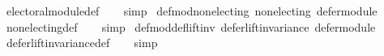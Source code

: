 \begin{isabellebody}
\ electoral{\isacharunderscore}{\kern0pt}module{\isacharunderscore}{\kern0pt}def\isanewline
\ \ \isamarkupfalse%
\ simp%
\endisatagproof
{\isafoldproof}%
%
\isadelimproof
%
\endisadelimproof
%
\isadelimdocument
%
\endisadelimdocument
%
\isatagdocument
%
\isamarkuptrue%
%
\endisatagdocument
{\isafolddocument}%
%
\isadelimdocument
%
\endisadelimdocument
{}\isamarkupfalse%
\ def{\isacharunderscore}{\kern0pt}mod{\isacharunderscore}{\kern0pt}non{\isacharunderscore}{\kern0pt}electing{\isacharcolon}{\kern0pt}\ {\isachardoublequoteopen}non{\isacharunderscore}{\kern0pt}electing\ defer{\isacharunderscore}{\kern0pt}module{\isachardoublequoteclose}\isanewline
%
\isadelimproof
\ \ %
\endisadelimproof
%
\isatagproof
{}\isamarkupfalse%
\ non{\isacharunderscore}{\kern0pt}electing{\isacharunderscore}{\kern0pt}def\isanewline
\ \ \isamarkupfalse%
\ simp%
\endisatagproof
{\isafoldproof}%
%
\isadelimproof
\isanewline
%
\endisadelimproof
\isanewline
{}\isamarkupfalse%
\ def{\isacharunderscore}{\kern0pt}mod{\isacharunderscore}{\kern0pt}def{\isacharunderscore}{\kern0pt}lift{\isacharunderscore}{\kern0pt}inv{\isacharcolon}{\kern0pt}\ {\isachardoublequoteopen}defer{\isacharunderscore}{\kern0pt}lift{\isacharunderscore}{\kern0pt}invariance\ defer{\isacharunderscore}{\kern0pt}module{\isachardoublequoteclose}\isanewline
%
\isadelimproof
\ \ %
\endisadelimproof
%
\isatagproof
{}\isamarkupfalse%
\ defer{\isacharunderscore}{\kern0pt}lift{\isacharunderscore}{\kern0pt}invariance{\isacharunderscore}{\kern0pt}def\isanewline
\ \ \isamarkupfalse%
\ simp%
\endisatagproof
{\isafoldproof}%
%
\isadelimproof
\isanewline
%
\endisadelimproof
%
\isadelimtheory
\isanewline
%
\endisadelimtheory
%
\isatagtheory
{}\isamarkupfalse%
%
\endisatagtheory
{\isafoldtheory}%
%
\isadelimtheory
%
\endisadelimtheory
%
\end{isabellebody}%
\endinput
